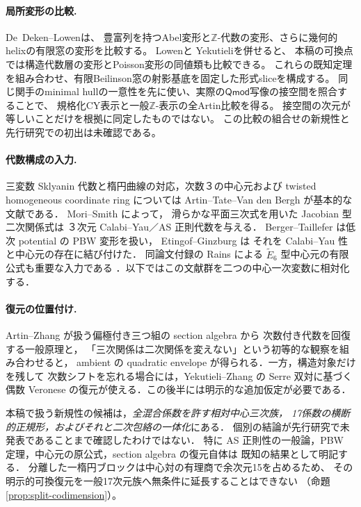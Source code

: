 \documentclass[11pt,a4paper]{ltjsarticle}
\numberwithin{equation}{section}
\begin{document}
\paragraph{局所変形の比較.}
De~Deken--Lowen\cite[Theorems~4.5,5.15]{DeDekenLowen}は、
豊富列を持つAbel変形と$\mathbb Z$-代数の変形、さらに幾何的helixの有限窓の変形を比較する。
Lowen\cite[Theorems~3.14,3.26]{LowenRinged}と
Yekutieli\cite[Corollary~11.2]{YekutieliTwisted}を併せると、
本稿の可換点では構造代数層の変形とPoisson変形の同値類も比較できる。
これらの既知定理を組み合わせ、有限Beilinson窓の射影基底を固定した形式sliceを構成する。
同じ関手のminimal hullの一意性を先に使い、実際の$\mathsf{Qmod}$写像の接空間を照合することで、
規格化CY表示と一般$\mathbb Z$-表示の全Artin比較を得る。
接空間の次元が等しいことだけを根拠に同定したものではない。
この比較の組合せの新規性と先行研究での初出は未確認である。

\paragraph{代数構成の入力.}
三変数 Sklyanin 代数と楕円曲線の対応，次数３の中心元および
twisted homogeneous coordinate ring については
Artin--Tate--Van den Bergh \cite{ATV} が基本的な文献である．
Mori--Smith \cite[Theorem~4.2(1)]{MS} によって，
滑らかな平面三次式を用いた Jacobian 型二次関係式は
３次元 Calabi--Yau／AS 正則代数を与える．
Berger--Taillefer \cite{BT} は低次 potential の PBW 変形を扱い，
Etingof--Ginzburg \cite[Proposition~7.3.1(ii), Theorem~3.3.2]{EG} は
それを Calabi--Yau 性と中心元の存在に結び付けた．
同論文付録の Rains による $\widetilde E_6$ 型中心元の有限公式も重要な入力である
\cite[\S9.1]{EG}．以下ではこの文献群を二つの中心一次変数に相対化する．

\paragraph{復元の位置付け.}
Artin--Zhang \cite{AZ} が扱う偏極付き三つ組の section algebra から
次数付き代数を回復する一般原理と，
「三次関係は二次関係を変えない」という初等的な観察を組み合わせると，
ambient の quadratic envelope が得られる．一方，構造対象だけを残して
次数シフトを忘れる場合には，Yekutieli--Zhang \cite{YZ} の Serre 双対に基づく
偶数 Veronese の復元が使える．この後半には明示的な追加仮定が必要である．

本稿で扱う新規性の候補は，\emph{全混合係数を許す相対中心三次族，
17係数の横断的正規形，およびそれと二次包絡の一体化}にある．
個別の結論が先行研究で未発表であることまで確認したわけではない．
特に AS 正則性の一般論，PBW 定理，中心元の原公式，section algebra の復元自体は
既知の結果として明記する．
分離した一楕円ブロックは中心対の有理商で余次元15を占めるため、
その明示的可換復元を一般17次元族へ無条件に延長することはできない
（命題\ref{prop:split-codimension}）。
\end{document}

